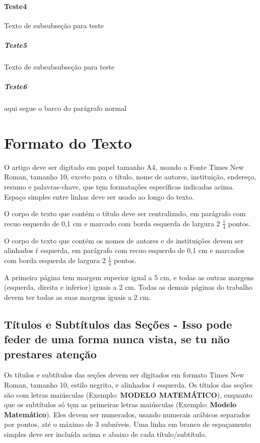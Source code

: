 \documentclass{ufscThesis}
\begin{document}
\subsubsection{Teste4}
Texto de subsubseçăo para teste

\paragraph{Teste5}
Texto de subsubsubseçăo para teste

\paragraph{Teste6}

aqui segue o barco do parágrafo normal


\chapter{Formato do Texto}
O artigo deve ser digitado em papel tamanho A4, usando a Fonte Times New Roman, tamanho 10, exceto para o título, nome de autores, instituiçăo, endereço, resumo e palavras-chave, que tęm formataçőes específicas indicadas acima. Espaço simples entre linhas deve ser usado ao longo do texto.

O corpo de texto que contém o título deve ser centralizado, em parágrafo com recuo esquerdo de 0,1 cm e marcado com borda esquerda de largura 2 $\frac{1}{4}$ pontos.

O corpo de texto que contém os nomes de autores e de instituiçőes devem ser alinhados ŕ esquerda, em parágrafo com recuo esquerdo de 0,1 cm e marcados com borda esquerda de largura 2 $\frac{1}{4}$ pontos.

A primeira página tem margem superior igual a 5 cm, e todas as outras margens (esquerda, direita e inferior) iguais a 2 cm. Todas as demais páginas do trabalho devem ter todas as suas margens iguais a 2 cm.

\section{Títulos e Subtítulos das Seçőes - Isso pode feder de uma forma nunca vista, se tu năo prestares atençăo}
Os títulos e subtítulos das seçőes devem ser digitados em formato Times New Roman, tamanho 10, estilo negrito, e alinhados ŕ esquerda. Os títulos das seçőes săo com letras maiúsculas (Exemplo: \textbf{MODELO MATEMÁTICO}), enquanto que os subtítulos só tęm as primeiras letras maiúsculas (Exemplo: \textbf{Modelo Matemático}). Eles devem ser numerados, usando numerais arábicos separados por pontos, até o máximo de 3 subníveis. Uma linha em branco de espaçamento simples deve ser incluída acima e abaixo de cada título/subtítulo.
\end{document}
